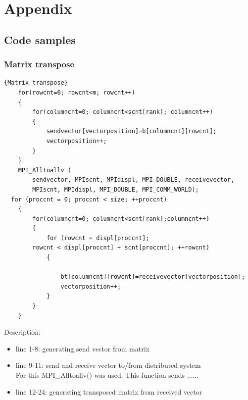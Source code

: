 \documentclass{article}
\begin{document}
\section{Appendix}
\subsection{Code samples}
\subsubsection{Matrix transpose\label{matrixtranspose}}
\begin{lstlisting}[caption=Matrix transposition using MPI]{Matrix transpose}
    for(rowcnt=0; rowcnt<m; rowcnt++)
    {
        for(columncnt=0; columncnt<scnt[rank]; columncnt++)
        {
            sendvector[vectorposition]=b[columncnt][rowcnt];
            vectorposition++;
        }
    }
    MPI_Alltoallv (
        sendvector,	MPIscnt, MPIdispl, MPI_DOUBLE, receivevector,
        MPIscnt, MPIdispl, MPI_DOUBLE, MPI_COMM_WORLD);
  for (proccnt = 0; proccnt < size; ++proccnt)
    {
        for(columncnt=0; columncnt<scnt[rank];columncnt++)
        {
            for (rowcnt = displ[proccnt]; 
		rowcnt < displ[proccnt] + scnt[proccnt]; ++rowcnt)
            {

                bt[columncnt][rowcnt]=receivevector[vectorposition];
                vectorposition++;
            }
        }
    }
\end{lstlisting}
Description:
\begin{itemize}
\item line 1-8: generating send vector from matrix
\item line 9-11: send and receive vector to/from distributed system\\
For this MPI\_Alltoallv() was used. This function sends ......
\item line 12-24: generating transposed matrix from received vector
\end{itemize}
\end{document}
